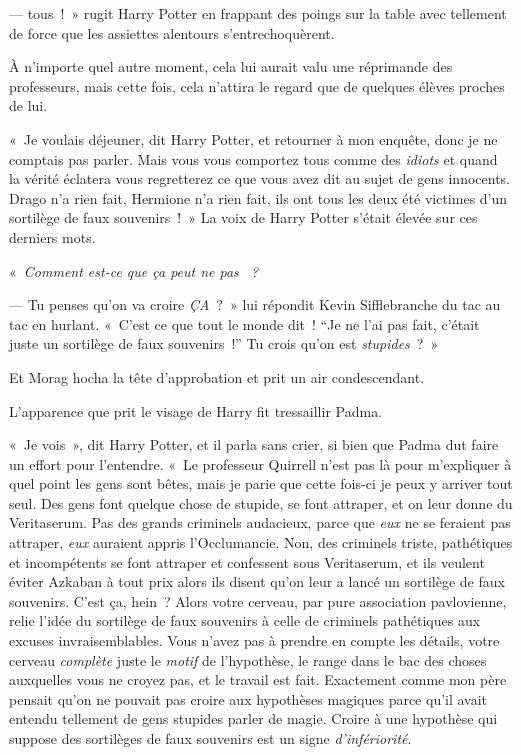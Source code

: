 ---  tous~!~»
rugit Harry Potter en frappant des poings sur la table avec tellement de force que les assiettes alentours s'entrechoquèrent.

À n'importe quel autre moment, cela lui aurait valu une réprimande des professeurs, mais cette fois, cela n'attira le regard que de quelques élèves proches de lui.

«~Je voulais déjeuner, dit Harry Potter, et retourner à mon enquête, donc je ne comptais pas parler.
Mais vous vous comportez tous comme des \emph{idiots} et quand la vérité éclatera vous regretterez ce que vous avez dit au sujet de gens innocents.
Drago n'a rien fait, Hermione n'a rien fait, ils ont tous les deux été victimes d'un sortilège de faux souvenirs~!~»
La voix de Harry Potter s'était élevée sur ces derniers mots.

«~\emph{Comment est-ce que ça peut ne pas ~?}

--- Tu penses qu'on va croire \emph{ÇA}~?~»
lui répondit Kevin Sifflebranche du tac au tac en hurlant.
«~C'est ce que tout le monde dit~!
“Je ne l'ai pas fait, c'était juste un sortilège de faux souvenirs~!” Tu crois qu'on est \emph{stupides}~?~»

Et Morag hocha la tête d'approbation et prit un air condescendant.

L'apparence que prit le visage de Harry fit tressaillir Padma.

«~Je vois~», dit Harry Potter, et il parla sans crier, si bien que Padma dut faire un effort pour l'entendre.
«~Le professeur Quirrell n'est pas là pour m'expliquer à quel point les gens sont bêtes, mais je parie que cette fois-ci je peux y arriver tout seul.
Des gens font quelque chose de stupide, se font attraper, et on leur donne du Veritaserum.
Pas des grands criminels audacieux, parce que \emph{eux} ne se feraient pas attraper, \emph{eux} auraient appris l'Occlumancie.
Non, des criminels triste, pathétiques et incompétents se font attraper et confessent sous Veritaserum, et ils veulent éviter Azkaban à tout prix alors ils disent qu'on leur a lancé un sortilège de faux souvenirs.
C'est ça, hein~?
Alors votre cerveau, par pure association pavlovienne, relie l'idée du sortilège de faux souvenirs à celle de criminels pathétiques aux excuses invraisemblables.
Vous n'avez pas à prendre en compte les détails, votre cerveau \emph{complète} juste le \emph{motif} de l'hypothèse, le range dans le bac des choses auxquelles vous ne croyez pas, et le travail est fait.
Exactement comme mon père pensait qu'on ne pouvait pas croire aux hypothèses magiques parce qu'il avait entendu tellement de gens stupides parler de magie.
Croire à une hypothèse qui suppose des sortilèges de faux souvenirs est un signe \emph{d'infériorité}.

